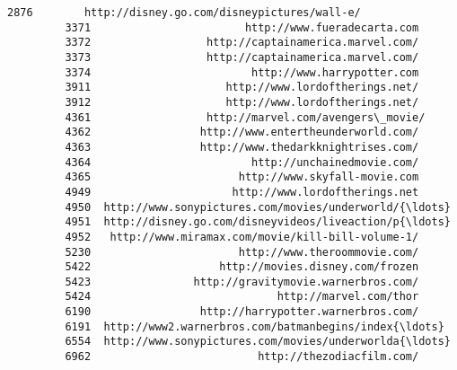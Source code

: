 \documentclass[11pt]{article}
\begin{document}
\begin{Verbatim}[commandchars=\\\{\}]
         2876        http://disney.go.com/disneypictures/wall-e/   
         3371                        http://www.fueradecarta.com   
         3372                  http://captainamerica.marvel.com/   
         3373                  http://captainamerica.marvel.com/   
         3374                         http://www.harrypotter.com   
         3911                     http://www.lordoftherings.net/   
         3912                     http://www.lordoftherings.net/   
         4361                  http://marvel.com/avengers\_movie/   
         4362                 http://www.entertheunderworld.com/   
         4363                 http://www.thedarkknightrises.com/   
         4364                         http://unchainedmovie.com/   
         4365                       http://www.skyfall-movie.com   
         4949                      http://www.lordoftherings.net   
         4950  http://www.sonypictures.com/movies/underworld/{\ldots}   
         4951  http://disney.go.com/disneyvideos/liveaction/p{\ldots}   
         4952   http://www.miramax.com/movie/kill-bill-volume-1/   
         5230                       http://www.theroommovie.com/   
         5422                    http://movies.disney.com/frozen   
         5423                http://gravitymovie.warnerbros.com/   
         5424                             http://marvel.com/thor   
         6190                 http://harrypotter.warnerbros.com/   
         6191  http://www2.warnerbros.com/batmanbegins/index{\ldots}   
         6554  http://www.sonypictures.com/movies/underworlda{\ldots}   
         6962                          http://thezodiacfilm.com/   
         

\end{Verbatim}
\end{document}
